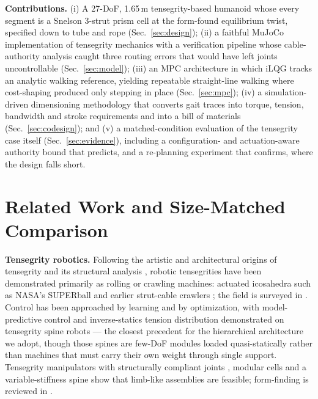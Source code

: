 \documentclass[conference]{IEEEtran}
\begin{document}
\textbf{Contributions.} (i) A 27-DoF, 1.65\,m tensegrity-based humanoid whose
every segment is a Snelson 3-strut prism cell at the form-found equilibrium
twist, specified down to tube and rope (Sec.~\ref{sec:design}); (ii) a
faithful MuJoCo implementation of tensegrity mechanics with a verification
pipeline whose cable-authority analysis caught three routing errors that would
have left joints uncontrollable (Sec.~\ref{sec:model}); (iii) an MPC
architecture in which iLQG tracks an analytic walking reference, yielding
repeatable straight-line walking where cost-shaping produced only stepping in
place (Sec.~\ref{sec:mpc}); (iv) a simulation-driven dimensioning methodology
that converts gait traces into torque, tension, bandwidth and stroke
requirements and into a bill of materials (Sec.~\ref{sec:codesign}); and (v) a
matched-condition evaluation of the tensegrity case itself
(Sec.~\ref{sec:evidence}), including a configuration- and actuation-aware
authority bound that predicts, and a re-planning experiment that confirms,
where the design falls short.

\section{Related Work and Size-Matched Comparison}
\label{sec:related}

\textbf{Tensegrity robotics.} Following the artistic and architectural origins
of tensegrity \cite{fuller1962patent,snelson1965patent} and its structural
analysis \cite{calladine1978tensegrity,skelton2009tensegrity}, robotic
tensegrities have been demonstrated primarily as rolling or crawling machines:
actuated icosahedra such as NASA's SUPERball
\cite{sabelhaus2015superball,caluwaerts2014design} and earlier strut-cable
crawlers \cite{paul2006locomotion}; the field is surveyed in
\cite{shah2022tensegrity}. Control has been approached by learning
\cite{zhang2017tensegrityrl,surovik2021adaptive} and by optimization, with
model-predictive control and inverse-statics tension distribution demonstrated
on tensegrity spine robots \cite{sabelhaus2018spinempc} --- the closest
precedent for the hierarchical architecture we adopt, though those spines are
few-DoF modules loaded quasi-statically rather than machines that must carry
their own weight through single support. Tensegrity manipulators with
structurally compliant joints \cite{lessard2016manipulator}, modular cells
\cite{zappetti2017modular} and a variable-stiffness spine
\cite{zappetti2020spine} show that limb-like assemblies are feasible;
form-finding is reviewed in \cite{tibert2003form,aloui2019morphogenesis}.
\end{document}
